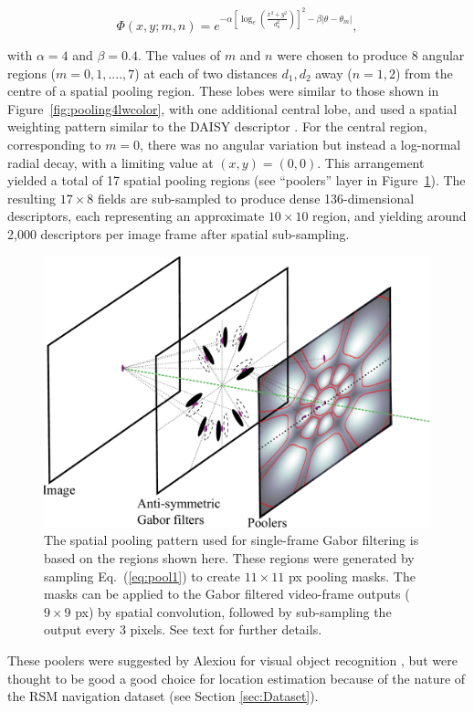 \begin{equation}
\Phi(x,y;m,n) = e^{-\alpha \left [\log_e \left ( \frac{x^2+y^2}{d_n^2}\right ) \right ]^2 - \beta |\theta-\theta_m | },
\label{eq:pool1}
\end{equation}

\noindent with $\alpha = 4$ and $\beta = 0.4$. The values of $m$ and $n$ were chosen to produce 8 angular regions ($m = 0, 1, ...., 7$) at each of two distances $d_1, d_2$ away ($n=1,2$) from the centre of a spatial pooling region. These lobes were similar to those shown in Figure~\ref{fig:pooling4lwcolor}, with one additional central lobe, and used a spatial weighting pattern similar to the DAISY descriptor \cite{Winder2009}. For the central region, corresponding to $m=0$, there was no angular variation but instead a log-normal radial decay, with a limiting value at $(x,y)=(0,0)$. This arrangement yielded a total of  17 spatial pooling regions (see ``poolers'' layer in Figure~\ref{fig:IsoPool}). The resulting $17 \times 8$ fields are sub-sampled to produce dense 136-dimensional descriptors, each representing an approximate $10 \times 10$ region, and yielding around 2,000 descriptors per image frame after spatial sub-sampling. 

\begin{figure}[t]
\centering
\includegraphics[width=0.7\linewidth]{./gfx/Chapter04/Layers.pdf}
\caption{The spatial pooling pattern used for single-frame Gabor filtering is based on the regions shown here.  These regions were generated by sampling Eq.~(\ref{eq:pool1}) to create $11 \times 11$ px pooling masks. The masks can be applied to the Gabor filtered video-frame outputs ($9 \times 9$ px) by spatial convolution, followed by sub-sampling the output every 3 pixels. See text for further details.}
\label{fig:IsoPool}
\end{figure}

These poolers were suggested by Alexiou for visual object recognition \cite{Alexiou2013}, but were thought to be good a good choice for location estimation because of the nature of the RSM navigation dataset (see Section \ref{sec:Dataset}).


